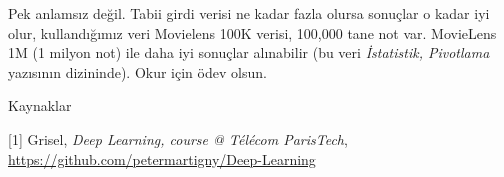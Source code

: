 \documentclass[12pt,fleqn]{article}\usepackage{../../common}
\begin{document}
Pek anlamsız değil. Tabii girdi verisi ne kadar fazla olursa sonuçlar o
kadar iyi olur, kullandığımız veri Movielens 100K verisi, 100,000 tane not
var. MovieLens 1M (1 milyon not) ile daha iyi sonuçlar alınabilir (bu veri
{\em İstatistik, Pivotlama} yazısının dizininde). Okur için ödev olsun.

Kaynaklar

[1] Grisel, {\em Deep Learning, course @ Télécom ParisTech}, \url{https://github.com/petermartigny/Deep-Learning}
\end{document}
